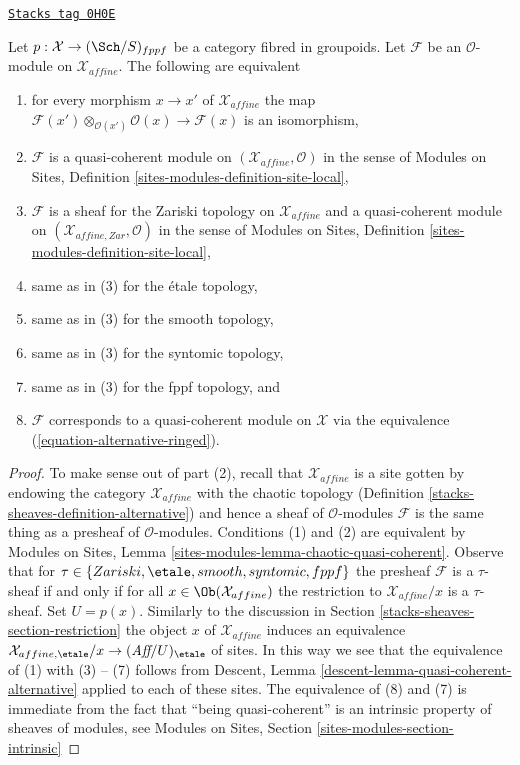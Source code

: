 \begin{lemma}
\label{stacks-sheaves-lemma-quasi-coherent-alternative}
\href{https://stacks.math.columbia.edu/tag/0H0E}{\texttt{Stacks tag 0H0E}}

Let $p : \mathcal{X} \to (\Sch/S)_{fppf}$ be a category fibred in groupoids.
Let $\mathcal{F}$ be an $\mathcal{O}$-module on $\mathcal{X}_{affine}$.
The following are equivalent
\begin{enumerate}
\item for every morphism $x \to x'$ of $\mathcal{X}_{affine}$ the map
$\mathcal{F}(x') \otimes_{\mathcal{O}(x')} \mathcal{O}(x) \to \mathcal{F}(x)$
is an isomorphism,
\item $\mathcal{F}$ is a quasi-coherent module on
$(\mathcal{X}_{affine}, \mathcal{O})$ in the sense of
Modules on Sites, Definition \ref{sites-modules-definition-site-local},
\item $\mathcal{F}$ is a sheaf for the Zariski topology on
$\mathcal{X}_{affine}$ and a quasi-coherent module on
$(\mathcal{X}_{affine, Zar}, \mathcal{O})$ in the sense of
Modules on Sites, Definition \ref{sites-modules-definition-site-local},
\item same as in (3) for the \'etale topology,
\item same as in (3) for the smooth topology,
\item same as in (3) for the syntomic topology,
\item same as in (3) for the fppf topology, and
\item $\mathcal{F}$ corresponds to a quasi-coherent module
on $\mathcal{X}$ via the equivalence (\ref{equation-alternative-ringed}).
\end{enumerate}
\end{lemma}

\begin{proof}
To make sense out of part (2), recall that $\mathcal{X}_{affine}$ is a site
gotten by endowing the category $\mathcal{X}_{affine}$ with the chaotic
topology (Definition \ref{stacks-sheaves-definition-alternative}) and hence a sheaf
of $\mathcal{O}$-modules $\mathcal{F}$ is the same thing as
a presheaf of $\mathcal{O}$-modules. Conditions (1) and (2)
are equivalent by Modules on Sites, Lemma
\ref{sites-modules-lemma-chaotic-quasi-coherent}.
Observe that for $\tau \in \{Zariski, \etale, smooth, syntomic, fppf\}$
the presheaf $\mathcal{F}$ is a $\tau$-sheaf if and only if
for all $x \in \Ob(\mathcal{X}_{affine})$ the restriction
to $\mathcal{X}_{affine}/x$ is a $\tau$-sheaf. Set $U = p(x)$.
Similarly to the discussion in Section \ref{stacks-sheaves-section-restriction}
the object $x$ of $\mathcal{X}_{affine}$ induces an equivalence
$\mathcal{X}_{affine, \etale}/x \to (\textit{Aff}/U)_\etale$ of sites.
In this way we see that the equivalence of (1) with (3) -- (7)
follows from Descent, Lemma \ref{descent-lemma-quasi-coherent-alternative}
applied to each of these sites. The equivalence of (8) and (7)
is immediate from the fact that ``being quasi-coherent'' is an
intrinsic property of sheaves of modules, see
Modules on Sites, Section \ref{sites-modules-section-intrinsic}
\end{proof}

